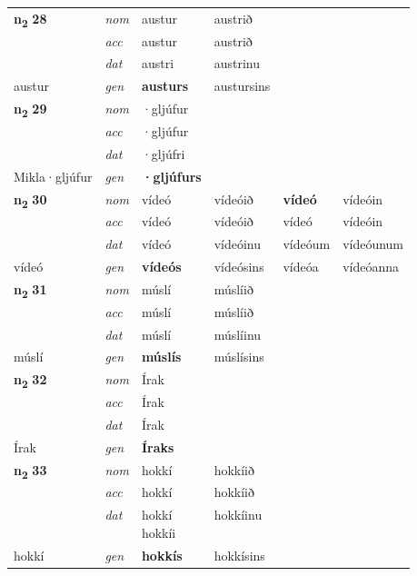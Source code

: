 \begin{longtable}[l]{X>{\footnotesize\itshape}XXXXX}
\multirow{3}{*}{{{\textbf{n{\textsubscript{2}}} \Large{\textbf{28}}}}} & nom & austur & austrið & \textbf{} &  \\*
 & acc & austur & austrið &  &  \\*
 & dat & austri & austrinu &  &  \\*
 {\footnotesize{austur}} & gen & \textbf{austurs} & austursins &  &  \\
\cmidrule{1-6}

\multirow{3}{*}{{{\textbf{n{\textsubscript{2}}} \Large{\textbf{29}}}}} & nom & ·gljúfur &  & \textbf{} &  \\*
 & acc & ·gljúfur &  &  &  \\*
 & dat & ·gljúfri &  &  &  \\*
 {\footnotesize{Mikla\allowbreak ·gljúfur}} & gen & \textbf{·gljúfurs} &  &  &  \\


\multirow{3}{*}{{{\textbf{n{\textsubscript{2}}} \Large{\textbf{30}}}}} & nom & vídeó & vídeóið & \textbf{vídeó} & vídeóin \\*
 & acc & vídeó & vídeóið & vídeó & vídeóin \\*
 & dat & vídeó & vídeóinu & vídeóum & vídeóunum \\*
 {\footnotesize{vídeó}} & gen & \textbf{vídeós} & vídeósins & vídeóa & vídeóanna \\
\cmidrule{1-6}

\multirow{3}{*}{{{\textbf{n{\textsubscript{2}}} \Large{\textbf{31}}}}} & nom & múslí & múslíið & \textbf{} &  \\*
 & acc & múslí & múslíið &  &  \\*
 & dat & múslí & múslíinu &  &  \\*
 {\footnotesize{múslí}} & gen & \textbf{múslís} & múslísins &  &  \\
\cmidrule{1-6}

\multirow{3}{*}{{{\textbf{n{\textsubscript{2}}} \Large{\textbf{32}}}}} & nom & Írak &  & \textbf{} &  \\*
 & acc & Írak &  &  &  \\*
 & dat & Írak &  &  &  \\*
 {\footnotesize{Írak}} & gen & \textbf{Íraks} &  &  &  \\
\cmidrule{1-6}

\multirow{3}{*}{{{\textbf{n{\textsubscript{2}}} \Large{\textbf{33}}}}} & nom & hokkí & hokkíið & \textbf{} &  \\*
 & acc & hokkí & hokkíið &  &  \\*
 & dat & \specialcell{hokkí\\ hokkíi} & hokkíinu &  &  \\*
 {\footnotesize{hokkí}} & gen & \textbf{hokkís} & hokkísins &  &  \\
\cmidrule{1-6}


\end{longtable}
